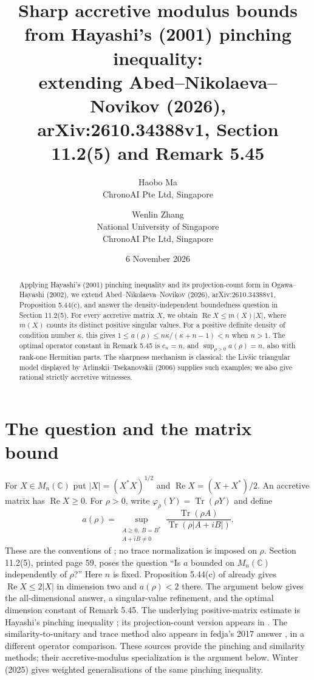 \documentclass[11pt]{article}
\title{Sharp accretive modulus bounds from Hayashi's (2001) pinching inequality:\\
extending Abed--Nikolaeva--Novikov (2026),\\
arXiv:2610.34388v1, Section 11.2(5) and Remark 5.45}
\author{Haobo Ma\\{\small ChronoAI Pte Ltd, Singapore}
\and Wenlin Zhang\\{\small National University of Singapore}\\
{\small ChronoAI Pte Ltd, Singapore}}
\date{6 November 2026}
\newcommand{\Tr}{\operatorname{Tr}}
\newcommand{\Ree}{\operatorname{Re}}
\newcommand{\C}{\mathbb C}
\begin{document}
\maketitle
\begin{abstract}
Applying Hayashi's (2001) pinching inequality and its projection-count form
in Ogawa--Hayashi (2002), we extend Abed--Nikolaeva--Novikov (2026),
arXiv:2610.34388v1, Proposition 5.44(c), and answer the density-independent
boundedness question in Section 11.2(5).
For every accretive matrix $X$, we obtain $\Ree X\leq m(X)|X|$,
where $m(X)$ counts its distinct positive singular values.
For a positive definite density of condition number $\kappa$, this gives
$1\leq a(\rho)\leq n\kappa/(\kappa+n-1)<n$ when $n>1$.
The optimal operator constant in Remark 5.45 is $c_n=n$, and
$\sup_{\rho>0}a(\rho)=n$, also with rank-one Hermitian parts.
The sharpness mechanism is classical: the Liv\v{s}ic triangular model
displayed by Arlinskii--Tsekanovskii (2006) supplies such examples;
we also give rational strictly accretive witnesses.
\end{abstract}

\section{The question and the matrix bound}

For $X\in M_n(\C)$ put $|X|=(X^*X)^{1/2}$ and
$\Ree X=(X+X^*)/2$. An accretive matrix has $\Ree X\geq0$.
For $\rho>0$, write $\varphi_\rho(Y)=\Tr(\rho Y)$ and define
\begin{equation}\label{eq:def}
a(\rho)=\sup_{\substack{A\geq0,\ B=B^*\\A+iB\ne0}}
\frac{\Tr(\rho A)}{\Tr(\rho|A+iB|)}.
\end{equation}
These are the conventions of \cite[Sections 3.1 and 5.12]{ANN};
no trace normalization is imposed on $\rho$.
Section 11.2(5), printed page 59, poses the question
``Is $a$ bounded on $M_n(\C)$ independently of $\rho$?''
Here $n$ is fixed. Proposition 5.44(c) of \cite{ANN} already gives
$\Ree X\leq2|X|$ in dimension two and $a(\rho)<2$ there.
The argument below gives the all-dimensional answer, a singular-value
refinement, and the optimal dimension constant of Remark 5.45.
The underlying positive-matrix estimate is Hayashi's pinching inequality
\cite[Lemma 5]{H}; its projection-count version appears in
\cite[Appendix B, Lemma 4, (61)]{OH}.
The similarity-to-unitary and trace method also appears in fedja's
2017 answer \cite{fedja}, in a different operator comparison.
These sources provide the pinching and similarity methods; their
accretive-modulus specialization is the argument below. Winter (2025)
\cite[Section I, Lemma 1, (4)]{W} gives weighted generalisations of the
same pinching inequality.
\end{document}

